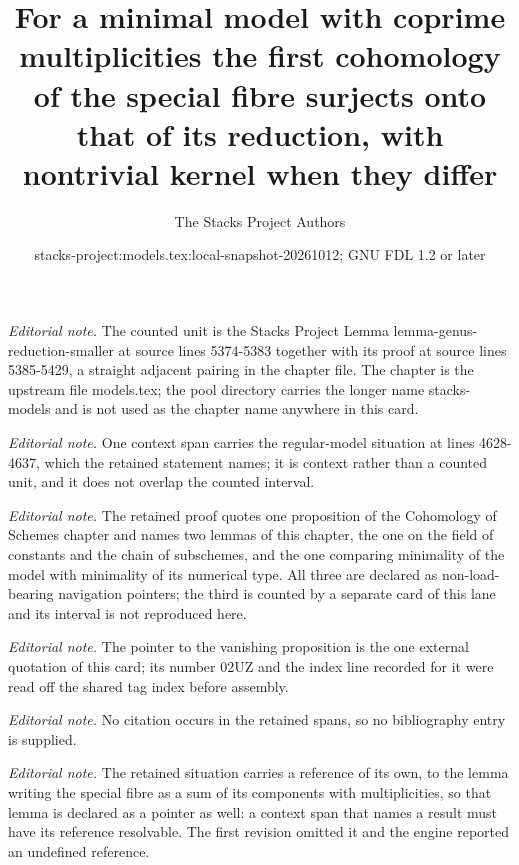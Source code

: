 \documentclass[10pt,a4paper]{amsart}
\title{For a minimal model with coprime multiplicities the first cohomology of the special fibre surjects onto that of its reduction, with nontrivial kernel when they differ}
\author{The Stacks Project Authors}
\date{stacks-project:models.tex:local-snapshot-20261012; GNU FDL 1.2 or later}
\theoremstyle{plain}
\theoremstyle{definition}
\theoremstyle{remark}
\numberwithin{equation}{subsection}
\begin{document}
\maketitle
\noindent\textit{Editorial note.} The counted unit is the Stacks Project Lemma lemma-genus-reduction-smaller at source lines 5374-5383 together with its proof at source lines 5385-5429, a straight adjacent pairing in the chapter file. The chapter is the upstream file models.tex; the pool directory carries the longer name stacks-models and is not used as the chapter name anywhere in this card.\par\medskip
\noindent\textit{Editorial note.} One context span carries the regular-model situation at lines 4628-4637, which the retained statement names; it is context rather than a counted unit, and it does not overlap the counted interval.\par\medskip
\noindent\textit{Editorial note.} The retained proof quotes one proposition of the Cohomology of Schemes chapter and names two lemmas of this chapter, the one on the field of constants and the chain of subschemes, and the one comparing minimality of the model with minimality of its numerical type. All three are declared as non-load-bearing navigation pointers; the third is counted by a separate card of this lane and its interval is not reproduced here.\par\medskip
\noindent\textit{Editorial note.} The pointer to the vanishing proposition is the one external quotation of this card; its number 02UZ and the index line recorded for it were read off the shared tag index before assembly.\par\medskip
\noindent\textit{Editorial note.} No citation occurs in the retained spans, so no bibliography entry is supplied.\par\medskip
\noindent\textit{Editorial note.}  The retained situation carries a reference of its own, to the lemma writing the special fibre as a sum of its components with multiplicities, so that lemma is declared as a pointer as well: a context span that names a result must have its reference resolvable. The first revision omitted it and the engine reported an undefined reference.\par\medskip
\end{document}
